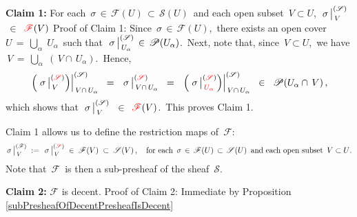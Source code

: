 \vskip 0.5cm
\noindent
\textbf{Claim 1:}\;\;
For each \,$\sigma \,\in\, \mathscr{F}(U) \,\subset\, \mathscr{S}(U)$\, and each open subset \,$V \subset U$,\,
$\left.\overset{{\color{white}.}}{\sigma}\,\right\vert^{(\mathscr{S})}_{\,V}$
\,$\in$\,
${\color{red}\mathscr{F}}(V)$
\vskip 0.2cm
\noindent
Proof of Claim 1:\;\;
Since \,$\sigma \,\in\, \mathscr{F}(U)$,\, there exists an open cover
\,$U \,=\, \underset{\alpha}{\bigcup}\;U_{\alpha}$\, such that
\,$\left.\overset{{\color{white}.}}{\sigma}\,\right\vert^{(\mathscr{S})}_{\,U_{\alpha}} \,\in\, \mathscr{P}(U_{\alpha})$.\,
Next, note that, since \,$V \subset U$,\, we have
\,$V \,=\, \underset{\alpha}{\bigcup}\;(\,V\cap\,U_{\alpha})$.\,
Hence,
\begin{equation*}
\left.\left(\,\left.\overset{{\color{white}.}}{\sigma}\,\right\vert^{({\color{red}\mathscr{S}})}_{\,V}\right)\right\vert^{(\mathscr{S})}_{\,V\cap\,U_{\alpha}}
\;\; = \;\;
	\left.\overset{{\color{white}.}}{\sigma}\,\right\vert^{({\color{red}\mathscr{S}})}_{\,V\cap\,U_{\alpha}}
\;\; = \;\;
	\left.\left(\,\left.\overset{{\color{white}.}}{\sigma}\,\right\vert^{({\color{red}\mathscr{S}})}_{\,{\color{red}U_{\alpha}}}\right)\right\vert^{(\mathscr{S})}_{\,V\cap\,U_{\alpha}}
\;\; \in \;\;
	\mathscr{P}(U_{\alpha}\cap\,V)\,,
\end{equation*}
which shows that
\,$\left.\overset{{\color{white}.}}{\sigma}\,\right\vert^{(\mathscr{S})}_{\,V}$
\,$\in$\,
${\color{red}\mathscr{F}}(V)$.\,
This proves Claim 1.

\vskip 0.5cm
\noindent
Claim 1 allows us to define the restriction maps of \,$\mathscr{F}$:
\begin{equation*}
\left.\overset{{\color{white}.}}{\sigma}\,\right\vert^{(\mathscr{F})}_{\,V}
\; := \;
	\left.\overset{{\color{white}.}}{\sigma}\,\right\vert^{({\color{red}\mathscr{S}})}_{\,V}
\; \in \;
	\mathscr{F}(V)
\; \subset \;
	\mathscr{S}(V)\,,
\quad
\textnormal{for each \,$\sigma \,\in\, \mathscr{F}(U) \,\subset\, \mathscr{S}(U)$\, and each open subset \,$V \subset U$}.
\end{equation*}
Note that \,$\mathscr{F}$\, is then a sub-presheaf of the sheaf \,$\mathscr{S}$.

\vskip 0.5cm
\noindent
\textbf{Claim 2:}\;\; $\mathscr{F}$ is decent.
\vskip 0.2cm
\noindent
Proof of Claim 2:\;\; Immediate by Proposition \ref{subPresheafOfDecentPresheafIsDecent}

